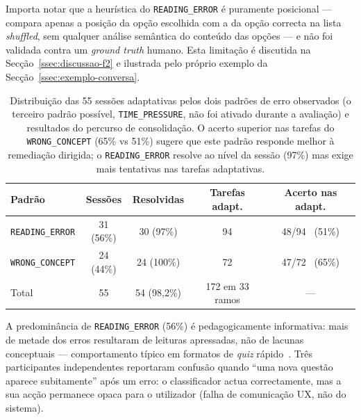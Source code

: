 Importa notar que a heurística do \texttt{READING\_ERROR} é puramente posicional --- compara apenas a posição da opção escolhida com a da opção correcta na lista \emph{shuffled}, sem qualquer análise semântica do conteúdo das opções --- e não foi validada contra um \emph{ground truth} humano. Esta limitação é discutida na Secção~\ref{ssec:discussao-f2} e ilustrada pelo próprio exemplo da Secção~\ref{ssec:exemplo-conversa}.

\begin{table}[htbp]
	\centering
	\small
	\begin{tabular}{l c c c c}
		\toprule
		\textbf{Padrão} & \textbf{Sessões} & \textbf{Resolvidas} & \textbf{Tarefas adapt.} & \textbf{Acerto nas adapt.} \\
		\midrule
		\texttt{READING\_ERROR} & 31 (56\%) & 30 (97\%) & 94 & 48/94 \ (51\%) \\
		\texttt{WRONG\_CONCEPT} & 24 (44\%) & 24 (100\%) & 72 & 47/72 \ (65\%) \\
		\midrule
		Total & 55 & 54 (98,2\%) & 172 em 33 ramos & --- \\
		\bottomrule
	\end{tabular}
	\caption[Distribuição dos padrões de erro e resultados do ciclo adaptativo]{Distribuição das 55 sessões adaptativas pelos dois padrões de erro observados (o terceiro padrão possível, \texttt{TIME\_PRESSURE}, não foi ativado durante a avaliação) e resultados do percurso de consolidação. O acerto superior nas tarefas do \texttt{WRONG\_CONCEPT} (65\% vs 51\%) sugere que este padrão responde melhor à remediação dirigida; o \texttt{READING\_ERROR} resolve ao nível da sessão (97\%) mas exige mais tentativas nas tarefas adaptativas.}
	\label{tab:padroes-erro}
\end{table}

A predominância de \texttt{READING\_ERROR} (56\%) é pedagogicamente informativa: mais de metade dos erros resultaram de leituras apressadas, não de lacunas conceptuais --- comportamento típico em formatos de \emph{quiz} rápido~\cite{vanlehn2011relative}. Três participantes independentes reportaram confusão quando ``uma nova questão aparece subitamente'' após um erro: o classificador actua correctamente, mas a sua acção permanece opaca para o utilizador (falha de comunicação UX, não do sistema).

